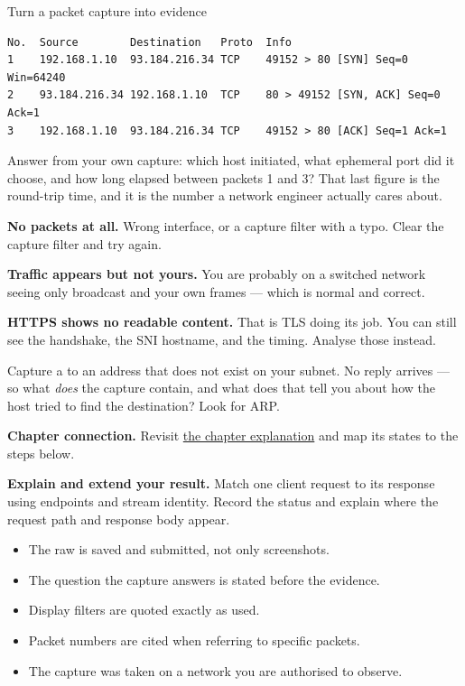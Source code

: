 \begin{labproject}{Turn a packet capture into evidence}
\begin{lstlisting}[style=utpterminal]
No.  Source        Destination   Proto  Info
1    192.168.1.10  93.184.216.34 TCP    49152 > 80 [SYN] Seq=0 Win=64240
2    93.184.216.34 192.168.1.10  TCP    80 > 49152 [SYN, ACK] Seq=0 Ack=1
3    192.168.1.10  93.184.216.34 TCP    49152 > 80 [ACK] Seq=1 Ack=1
\end{lstlisting}

Answer from your own capture: which host initiated, what ephemeral port did it choose, and how long elapsed between packets 1 and 3? That last figure is the round-trip time, and it is the number a network engineer actually cares about.

\begin{troubleshoot}
\textbf{No packets at all.} Wrong interface, or a capture filter with a typo. Clear the capture filter and try again.

\textbf{Traffic appears but not yours.} You are probably on a switched network seeing only broadcast and your own frames --- which is normal and correct.

\textbf{HTTPS shows no readable content.} That is TLS doing its job. You can still see the handshake, the SNI hostname, and the timing. Analyse those instead.
\end{troubleshoot}

\begin{tryit}
Capture a  to an address that does not exist on your subnet. No reply arrives --- so what \emph{does} the capture contain, and what does that tell you about how the host tried to find the destination? Look for ARP.
\end{tryit}
\end{labproject}

\textbf{Chapter connection.} Revisit \hyperref[ch:wireshark]{the chapter explanation} and map its states to the steps below.


\begin{verification}
\textbf{Explain and extend your result.} Match one client request to its response using endpoints and stream identity. Record the status and explain where the request path and response body appear.


\begin{itemize}
  \item The raw  is saved and submitted, not only screenshots.
  \item The question the capture answers is stated before the evidence.
  \item Display filters are quoted exactly as used.
  \item Packet numbers are cited when referring to specific packets.
  \item The capture was taken on a network you are authorised to observe.
\end{itemize}
\end{verification}
